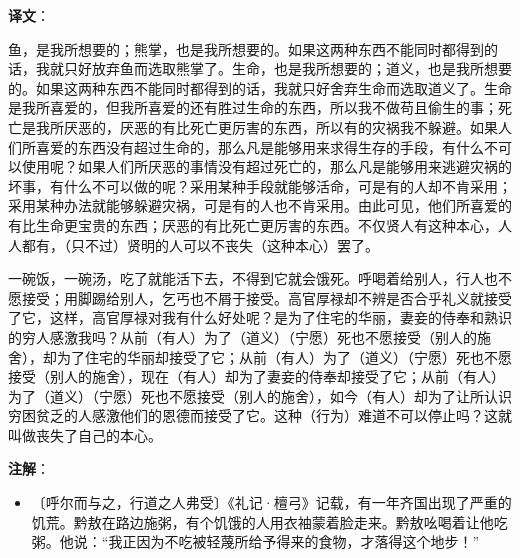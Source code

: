 \documentclass[12pt,UTF-8,openany,a4]{ctexbook}
\begin{document}
\newpage

\begin{Large}
   \noindent \textbf{译文}：
\end{Large}

\vspace{1em}

\begin{large}\yiwen
    
    鱼，是我所想要的；熊掌，也是我所想要的。如果这两种东西不能同时都得到的话，我就只好放弃鱼而选取熊掌了。生命，也是我所想要的；道义，也是我所想要的。如果这两种东西不能同时都得到的话，我就只好舍弃生命而选取道义了。生命是我所喜爱的，但我所喜爱的还有胜过生命的东西，所以我不做苟且偷生的事；死亡是我所厌恶的，厌恶的有比死亡更厉害的东西，所以有的灾祸我不躲避。如果人们所喜爱的东西没有超过生命的，那么凡是能够用来求得生存的手段，有什么不可以使用呢？如果人们所厌恶的事情没有超过死亡的，那么凡是能够用来逃避灾祸的坏事，有什么不可以做的呢？采用某种手段就能够活命，可是有的人却不肯采用；采用某种办法就能够躲避灾祸，可是有的人也不肯采用。由此可见，他们所喜爱的有比生命更宝贵的东西；厌恶的有比死亡更厉害的东西。不仅贤人有这种本心，人人都有，（只不过）贤明的人可以不丧失（这种本心）罢了。
    
    一碗饭，一碗汤，吃了就能活下去，不得到它就会饿死。呼喝着给别人，行人也不愿接受；用脚踢给别人，乞丐也不屑于接受。高官厚禄却不辨是否合乎礼义就接受了它，这样，高官厚禄对我有什么好处呢？是为了住宅的华丽，妻妾的侍奉和熟识的穷人感激我吗？从前（有人）为了（道义）（宁愿）死也不愿接受（别人的施舍），却为了住宅的华丽却接受了它；从前（有人）为了（道义）（宁愿）死也不愿接受（别人的施舍），现在（有人）却为了妻妾的侍奉却接受了它；从前（有人）为了（道义）（宁愿）死也不愿接受（别人的施舍），如今（有人）却为了让所认识穷困贫乏的人感激他们的恩德而接受了它。这种（行为）难道不可以停止吗？这就叫做丧失了自己的本心。
    

\end{large}


\newpage

\begin{Large}
   \noindent \textbf{注解}：
\end{Large}

\vspace{-1em}

\begin{itemize}
    \setlength\itemsep{-0.2em}
    \item〔呼尔而与之，行道之人弗受〕{\yiwen 《礼记·檀弓》记载，有一年齐国出现了严重的饥荒。黔敖在路边施粥，有个饥饿的人用衣袖蒙着脸走来。黔敖吆喝着让他吃粥。他说：“我正因为不吃被轻蔑所给予得来的食物，才落得这个地步！”}
\end{itemize}
\end{document}

